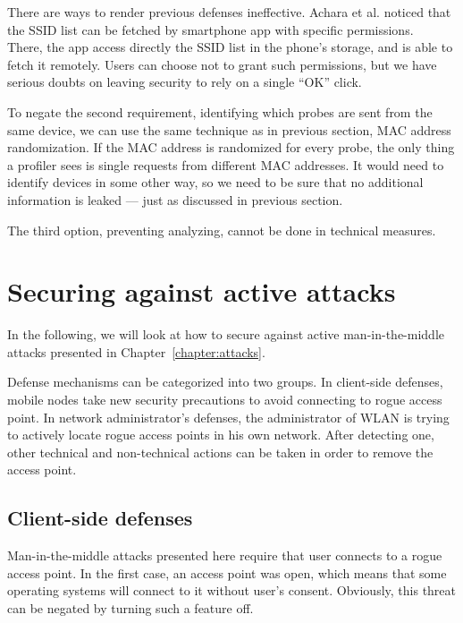\documentclass[12pt,a4paper,oneside,pdftex]{report}
\begin{document}
There are ways to render previous defenses ineffective. Achara et al. noticed that the SSID list can be fetched by smartphone app with specific permissions.~\cite{2014_WISEC_Achara} There, the app access directly the SSID list in the phone's storage, and is able to fetch it remotely. Users can choose not to grant such permissions, but we have serious doubts on leaving security to rely on a single ``OK'' click.

To negate the second requirement, identifying which probes are sent from the same device, we can use the same technique as in previous section, MAC address randomization. If the MAC address is randomized for every probe, the only thing a profiler sees is single requests from different MAC addresses. It would need to identify devices in some other way, so we need to be sure that no additional information is leaked --- just as discussed in previous section.

The third option, preventing analyzing, cannot be done in technical measures. 


\section{Securing against active attacks}

In the following, we will look at how to secure against active man-in-the-middle attacks presented in Chapter~\ref{chapter:attacks}. 

Defense mechanisms can be categorized into two groups. In client-side defenses, mobile nodes take new security precautions to avoid connecting to rogue access point. In network administrator's defenses, the administrator of WLAN is trying to actively locate rogue access points in his own network. After detecting one, other technical and non-technical actions can be taken in order to remove the access point.

\subsection{Client-side defenses}

Man-in-the-middle attacks presented here require that user connects to a rogue access point. In the first case, an access point was open, which means that some operating systems will connect to it without user's consent. Obviously, this threat can be negated by turning such a feature off. 
\end{document}
